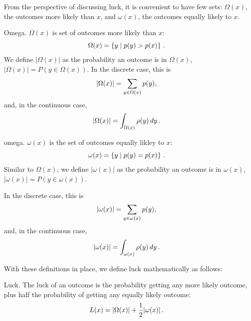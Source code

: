 From the perspective of discussing luck, it is convenient to have few sets: $\Omega(x)$, the outcomes more likely than $x$, and $\omega(x)$, the outcomes equally likely to $x$.

\begin{definition}{Omega.}  $\Omega(x)$ is set of outcomes more likely than $x$:
\begin{equation}
\index{Omega $\Omega$ ! definition}
\Omega(x) = \left\{ y \mid p(y)>p(x) \right\} \,.
\end{equation}
We define $|\Omega(x)|$ as the probability an outcome is in $\Omega(x)$,
$|\Omega(x)| = P(y\in\Omega(x))$.  In the discrete case, this is
\begin{equation}
\index{Omega $\Omega$ ! size $\abs{\Omega}$ (discrete)}
|\Omega(x)| = \sum_{y \in \Omega(x)} p(y),
\end{equation}
and, in the continuous case,
\begin{equation}
\index{Omega $\Omega$ ! size $\abs{\Omega}$ (continuous)}
|\Omega(x)| = \int_{\Omega(x)} \rho(y)\,dy \,.
\end{equation}
\end{definition}

\begin{definition}{omega.}
$\omega(x)$ is the set of outcomes equally likley to $x$:
\begin{equation}
\index{omega $\omega$ ! definition}
\omega(x) = \left\{ y \mid p(y)=p(x) \right\} \,.
\end{equation}
Similar to $\Omega(x)$, we define $|\omega(x)|$ as the probability an outcome is in $\omega(x)$,
$|\omega(x)| = P(y\in\omega(x))$.  

In the discrete case, this is
\begin{equation}
\index{omega $\omega$ ! size $\abs{\omega}$ (discrete)}
|\omega(x)| = \sum_{y \in \omega(x)} p(y),
\end{equation}
and, in the continuous case,
\begin{equation}
\index{omega $\omega$ ! size $\abs{\omega}$ (continuous)}
|\omega(x)| = \int_{\omega(x)} \rho(y)\,dy \,.
\end{equation}
\end{definition}

With these definitions in place, we define luck mathematically as follows:
\begin{definition}{Luck.}  The luck of an outcome is the probability getting any more likely outcome, plus half the probability of getting any equally likely outcome:
\begin{equation}
\index{luck $L$ ! definition}
L(x)=|\Omega(x)| + \frac{1}{2} |\omega(x)| \,.
\end{equation}
\end{definition}

